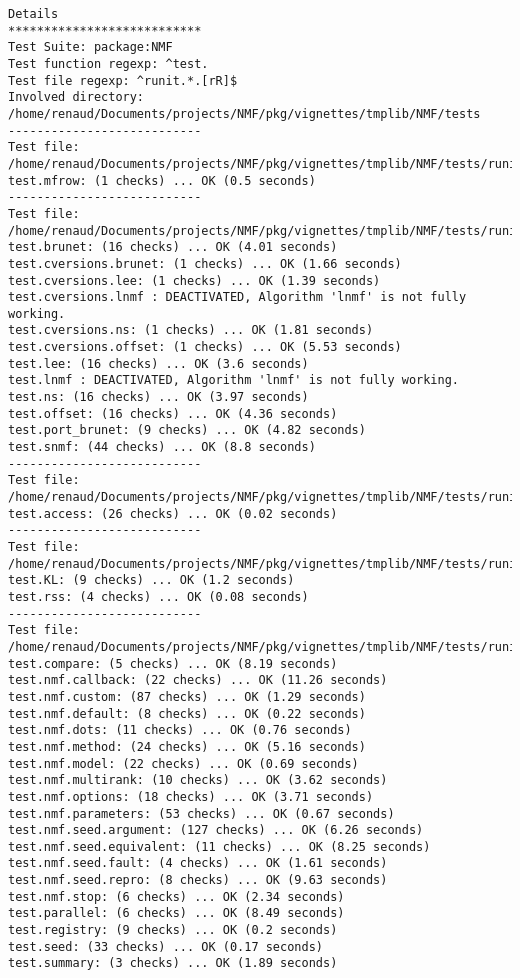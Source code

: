 \documentclass[10pt]{article}
\begin{document}
\begin{verbatim}
Details 
*************************** 
Test Suite: package:NMF 
Test function regexp: ^test. 
Test file regexp: ^runit.*.[rR]$ 
Involved directory: 
/home/renaud/Documents/projects/NMF/pkg/vignettes/tmplib/NMF/tests 
--------------------------- 
Test file: /home/renaud/Documents/projects/NMF/pkg/vignettes/tmplib/NMF/tests/runit.aheatmap.R 
test.mfrow: (1 checks) ... OK (0.5 seconds)
--------------------------- 
Test file: /home/renaud/Documents/projects/NMF/pkg/vignettes/tmplib/NMF/tests/runit.algorithms.r 
test.brunet: (16 checks) ... OK (4.01 seconds)
test.cversions.brunet: (1 checks) ... OK (1.66 seconds)
test.cversions.lee: (1 checks) ... OK (1.39 seconds)
test.cversions.lnmf : DEACTIVATED, Algorithm 'lnmf' is not fully working.
test.cversions.ns: (1 checks) ... OK (1.81 seconds)
test.cversions.offset: (1 checks) ... OK (5.53 seconds)
test.lee: (16 checks) ... OK (3.6 seconds)
test.lnmf : DEACTIVATED, Algorithm 'lnmf' is not fully working.
test.ns: (16 checks) ... OK (3.97 seconds)
test.offset: (16 checks) ... OK (4.36 seconds)
test.port_brunet: (9 checks) ... OK (4.82 seconds)
test.snmf: (44 checks) ... OK (8.8 seconds)
--------------------------- 
Test file: /home/renaud/Documents/projects/NMF/pkg/vignettes/tmplib/NMF/tests/runit.bioc.r 
test.access: (26 checks) ... OK (0.02 seconds)
--------------------------- 
Test file: /home/renaud/Documents/projects/NMF/pkg/vignettes/tmplib/NMF/tests/runit.distance.r 
test.KL: (9 checks) ... OK (1.2 seconds)
test.rss: (4 checks) ... OK (0.08 seconds)
--------------------------- 
Test file: /home/renaud/Documents/projects/NMF/pkg/vignettes/tmplib/NMF/tests/runit.interface.r 
test.compare: (5 checks) ... OK (8.19 seconds)
test.nmf.callback: (22 checks) ... OK (11.26 seconds)
test.nmf.custom: (87 checks) ... OK (1.29 seconds)
test.nmf.default: (8 checks) ... OK (0.22 seconds)
test.nmf.dots: (11 checks) ... OK (0.76 seconds)
test.nmf.method: (24 checks) ... OK (5.16 seconds)
test.nmf.model: (22 checks) ... OK (0.69 seconds)
test.nmf.multirank: (10 checks) ... OK (3.62 seconds)
test.nmf.options: (18 checks) ... OK (3.71 seconds)
test.nmf.parameters: (53 checks) ... OK (0.67 seconds)
test.nmf.seed.argument: (127 checks) ... OK (6.26 seconds)
test.nmf.seed.equivalent: (11 checks) ... OK (8.25 seconds)
test.nmf.seed.fault: (4 checks) ... OK (1.61 seconds)
test.nmf.seed.repro: (8 checks) ... OK (9.63 seconds)
test.nmf.stop: (6 checks) ... OK (2.34 seconds)
test.parallel: (6 checks) ... OK (8.49 seconds)
test.registry: (9 checks) ... OK (0.2 seconds)
test.seed: (33 checks) ... OK (0.17 seconds)
test.summary: (3 checks) ... OK (1.89 seconds)

\end{verbatim}
\end{document}
